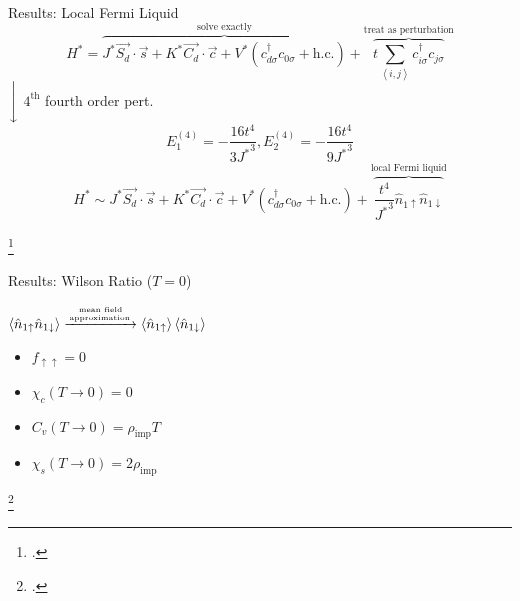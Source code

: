 \documentclass[aspectratio=169]{beamer}
\newcommand{\cen}[1]{\begin{center}{#1}\end{center}}
\begin{document}
\begin{frame}[noframenumbering]{Results: Local Fermi Liquid}
	\[H^* = \overbrace{J^* \vec{S_d}\cdot\vec{s} + K^* \vec{C_d}\cdot\vec{c} + V^* \left( c^\dagger_{d\sigma}c_{0\sigma} + \text{h.c.} \right)}^\text{solve exactly} + \overbrace{t\sum_{\left<i,j \right>}c^\dagger_{i\sigma}c_{j\sigma}}^\text{treat as perturbation}\]
	\hspace*{0.5\textwidth}$\Bigg\downarrow$ \(4^\text{th}\) fourth order pert.
	\[E_1^{(4)} = -\frac{16t^4}{3{J^*}^3}, E_2^{(4)} = -\frac{16t^4}{9{J^*}^3}\]
	\[H^* \sim J^* \vec{S_d}\cdot\vec{s} + K^* \vec{C_d}\cdot\vec{c} + V^* \left( c^\dagger_{d\sigma}c_{0\sigma} + \text{h.c.} \right) + \overbrace{\frac{t^4}{{J^*}^3} \hat n_{1 \uparrow}\hat n_{1 \downarrow}}^\text{local Fermi liquid}\]

\vspace*{-10pt}
\footcite{nozieres}
\end{frame}

\begin{frame}[noframenumbering]{Results: Wilson Ratio (\(T=0\))}
\vspace*{-10pt}
\cen{
	 \(\left<\hat n_{1 \uparrow}\hat n_{1 \downarrow}\right> \xrightarrow{\text{mean field}\atop \text{approximation}} \left<\hat n_{1 \uparrow}\right>\left<\hat n_{1 \downarrow}\right>\)\\[20pt]
\scalebox{1.5}{
	\(\epsilon_{k\sigma} = \epsilon_k^0 + \sum_q f_{kq}\left<n_{q\overline\sigma} \right>\)
}
}
\vspace*{\fill}
\hspace*{60pt}
\begin{minipage}{0.25\textwidth}
\begin{itemize}
	\item \(f_{\uparrow\uparrow} =0\)
	\item \(\chi_c(T\to 0) =0\)
\end{itemize}
\end{minipage}
\begin{minipage}{0.15\textwidth}
	\scalebox{2}{$\longrightarrow$}
\end{minipage}
\begin{minipage}{0.33\textwidth}
\begin{itemize}
	\item \(C_v(T\to 0) = \rho_\text{imp}T\)
	\item \(\chi_s(T \to 0) = 2\rho_\text{imp}\)
\end{itemize}
\end{minipage}
\hspace*{20pt}
\vspace*{\fill}
\cen{
}

\footcite{hewsonp}
\end{frame}
\end{document}
